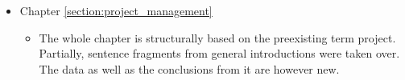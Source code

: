 \begin{itemize}
    \item Chapter \ref{section:project_management} 
        \begin{itemize}
            \item The whole chapter is structurally based on the preexisting term project.
            Partially, sentence fragments from general introductions were taken over.
            The data as well as the conclusions from it are however new.
        \end{itemize}


\end{itemize}
